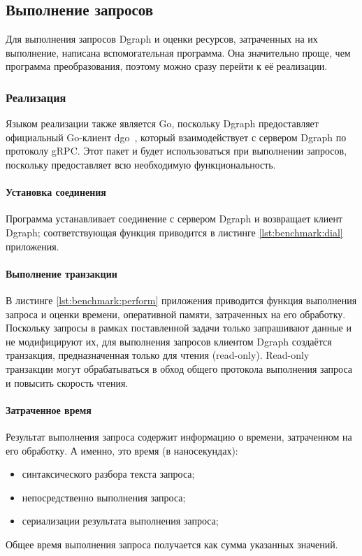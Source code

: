 \subsection{Выполнение запросов}

Для выполнения запросов Dgraph и оценки ресурсов, затраченных на их выполнение, написана вспомогательная
программа. Она значительно проще, чем программа преобразования, поэтому можно сразу перейти к её реализации.


\subsubsection{Реализация}

Языком реализации также является Go, поскольку Dgraph предоставляет официальный Go-клиент
dgo~\cite{dgo}, который взаимодействует с сервером Dgraph по протоколу gRPC. Этот пакет и будет
использоваться при выполнении запросов, поскольку предоставляет всю необходимую функциональность.

\paragraph{Установка соединения}

Программа устанавливает соединение с сервером Dgraph и возвращает клиент Dgraph; соответствующая функция
приводится в листинге \ref{lst:benchmark:dial} приложения.

\paragraph{Выполнение транзакции}

В листинге \ref{lst:benchmark:perform} приложения приводится функция выполнения запроса и оценки времени,
оперативной памяти, затраченных на его обработку. Поскольку запросы в рамках поставленной задачи только
запрашивают данные и не
модифицируют их, для выполнения запросов клиентом Dgraph создаётся транзакция, предназначенная только для чтения
(read-only). Read-only транзакции могут обрабатываться в обход общего протокола выполнения запроса и повысить
скорость чтения.

\paragraph{Затраченное время}

Результат выполнения запроса содержит информацию о времени, затраченном на его обработку. А именно, это
время (в наносекундах):
\begin{itemize}
    \item синтаксического разбора текста запроса;
    \item непосредственно выполнения запроса;
    \item сериализации результата выполнения запроса;
\end{itemize}
Общее время выполнения запроса получается как сумма указанных значений.

